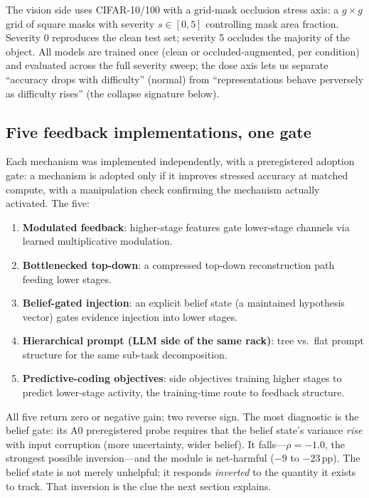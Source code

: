 \documentclass[10pt]{article}
\begin{document}
The vision side uses CIFAR-10/100 with a grid-mask occlusion stress axis:
a $g \times g$ grid of square masks with severity $s \in [0, 5]$ controlling
mask area fraction. Severity 0 reproduces the clean test set; severity 5
occludes the majority of the object. All models are trained once (clean or
occluded-augmented, per condition) and evaluated across the full severity
sweep; the dose axis lets us separate ``accuracy drops with difficulty''
(normal) from ``representations behave perversely as difficulty rises''
(the collapse signature below).

\subsection{Five feedback implementations, one gate}
\label{sec:fivefeedback}

Each mechanism was implemented independently, with a preregistered
adoption gate: a mechanism is adopted only if it improves stressed
accuracy at matched compute, with a manipulation check confirming the
mechanism actually activated. The five:
\begin{enumerate}
\item \textbf{Modulated feedback}: higher-stage features gate lower-stage
  channels via learned multiplicative modulation.
\item \textbf{Bottlenecked top-down}: a compressed top-down reconstruction
  path feeding lower stages.
\item \textbf{Belief-gated injection}: an explicit belief state (a
  maintained hypothesis vector) gates evidence injection into lower stages.
\item \textbf{Hierarchical prompt (LLM side of the same rack)}: tree vs.\
  flat prompt structure for the same sub-task decomposition.
\item \textbf{Predictive-coding objectives}: side objectives training
  higher stages to predict lower-stage activity, the training-time route
  to feedback structure.
\end{enumerate}
All five return zero or negative gain; two reverse sign. The most
diagnostic is the belief gate: its A0 preregistered probe requires that
the belief state's variance \emph{rise} with input corruption (more
uncertainty, wider belief). It falls---$\rho = -1.0$, the strongest
possible inversion---and the module is net-harmful ($-9$ to $-23$\,pp).
The belief state is not merely unhelpful; it responds \emph{inverted} to
the quantity it exists to track. That inversion is the clue the next
section explains.
\end{document}
